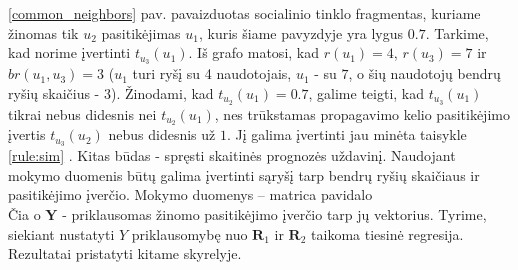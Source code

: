 \documentclass{VUMIFInfMagistrinis}
\begin{document}
\ref{common_neighbors} pav. pavaizduotas socialinio tinklo fragmentas, kuriame žinomas tik $u_2$ pasitikėjimas $u_1$, kuris šiame pavyzdyje yra lygus $0.7$. Tarkime, kad norime įvertinti $t_{u_3}(u_1)$. Iš grafo matosi, kad $r(u_1)=4$, $r(u_3) = 7$ ir $br(u_1,u_3)=3$ ($u_1$ turi ryšį su 4 naudotojais, $u_1$ - su $7$, o šių naudotojų bendrų ryšių skaičius - $3$). Žinodami, kad $t_{u_2}(u_1) = 0.7$, galime teigti, kad $t_{u_3}(u_1)$ tikrai nebus didesnis nei $t_{u_2}(u_1)$, nes trūkstamas propagavimo kelio pasitikėjimo įvertis $t_{u_3}({u_2})$ nebus didesnis už $1$. Jį galima įvertinti jau minėta taisykle \ref{rule:sim} .
Kitas būdas - spręsti skaitinės prognozės uždavinį. Naudojant mokymo duomenis būtų galima įvertinti sąryšį tarp bendrų ryšių skaičiaus ir pasitikėjimo įverčio. Mokymo duomenys – matrica pavidalo 
\begin{displaymath}
[ \boldsymbol{R_1}, \boldsymbol{R_2}, \boldsymbol{BR}, \boldsymbol{Y}]
\end{displaymath}
Čia 
 o $\boldsymbol{Y}$ - priklausomas žinomo pasitikėjimo įverčio tarp jų vektorius. Tyrime, siekiant nustatyti $Y$ priklausomybę nuo $\boldsymbol{R}_1$ ir $\boldsymbol{R}_2$ taikoma tiesinė regresija. Rezultatai pristatyti kitame skyrelyje.
\end{document}

